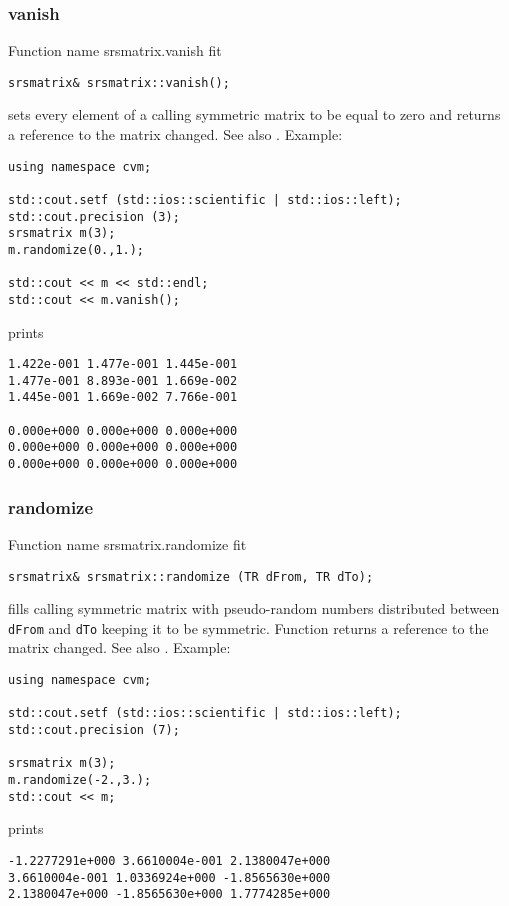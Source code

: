 \subsubsection{vanish}
Function%
\pdfdest name {srsmatrix.vanish} fit
\begin{verbatim}
srsmatrix& srsmatrix::vanish();
\end{verbatim}
sets every element of a calling symmetric 
matrix to be equal to zero
and returns a reference to
the matrix changed.
See also .
Example:
\begin{Verbatim}
using namespace cvm;

std::cout.setf (std::ios::scientific | std::ios::left); 
std::cout.precision (3);
srsmatrix m(3);
m.randomize(0.,1.);

std::cout << m << std::endl;
std::cout << m.vanish();
\end{Verbatim}
prints
\begin{Verbatim}
1.422e-001 1.477e-001 1.445e-001
1.477e-001 8.893e-001 1.669e-002
1.445e-001 1.669e-002 7.766e-001

0.000e+000 0.000e+000 0.000e+000
0.000e+000 0.000e+000 0.000e+000
0.000e+000 0.000e+000 0.000e+000
\end{Verbatim}
\newpage




\subsubsection{randomize}
Function%
\pdfdest name {srsmatrix.randomize} fit
\begin{verbatim}
srsmatrix& srsmatrix::randomize (TR dFrom, TR dTo);
\end{verbatim}
fills  calling symmetric matrix with pseudo-random 
numbers distributed between
\verb"dFrom" and \verb"dTo" keeping it to be symmetric.
Function
returns a reference to the matrix changed.
See also
.
Example:
\begin{Verbatim}
using namespace cvm;

std::cout.setf (std::ios::scientific | std::ios::left); 
std::cout.precision (7);

srsmatrix m(3);
m.randomize(-2.,3.);
std::cout << m;
\end{Verbatim}
prints
\begin{Verbatim}
-1.2277291e+000 3.6610004e-001 2.1380047e+000
3.6610004e-001 1.0336924e+000 -1.8565630e+000
2.1380047e+000 -1.8565630e+000 1.7774285e+000
\end{Verbatim}
\newpage

